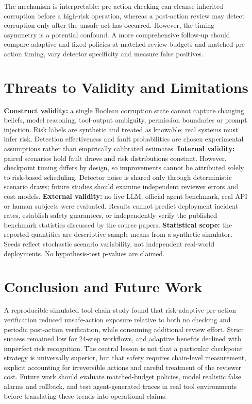 \documentclass[10pt,a4paper]{article}
\begin{document}
The mechanism is interpretable: pre-action checking can cleanse inherited corruption before a high-risk operation, whereas a post-action review may detect corruption only after the unsafe act has occurred. However, the timing asymmetry is a potential confound. A more comprehensive follow-up should compare adaptive and fixed policies at matched review budgets and matched pre-action timing, vary detector specificity and measure false positives.
\section{Threats to Validity and Limitations}
\textbf{Construct validity:} a single Boolean corruption state cannot capture changing beliefs, model reasoning, tool-output ambiguity, permission boundaries or prompt injection. Risk labels are synthetic and treated as knowable; real systems must infer risk. Detection effectiveness and fault probabilities are chosen experimental assumptions rather than empirically calibrated estimates.
\textbf{Internal validity:} paired scenarios hold fault draws and risk distributions constant. However, checkpoint timing differs by design, so improvements cannot be attributed solely to risk-based scheduling. Detector noise is shared only through deterministic scenario draws; future studies should examine independent reviewer errors and cost models.
\textbf{External validity:} no live LLM, official agent benchmark, real API or human subjects were evaluated. Results cannot predict deployment incident rates, establish safety guarantees, or independently verify the published benchmark statistics discussed by the source papers.
\textbf{Statistical scope:} the reported quantities are descriptive sample means from a synthetic simulator. Seeds reflect stochastic scenario variability, not independent real-world deployments. No hypothesis-test p-values are claimed.
\section{Conclusion and Future Work}
A reproducible simulated tool-chain study found that risk-adaptive pre-action verification reduced unsafe-action exposure relative to both no checking and periodic post-action verification, while consuming additional review effort. Strict success remained low for 24-step workflows, and adaptive benefits declined with imperfect risk recognition. The central lesson is not that a particular checkpoint strategy is universally superior, but that safety requires chain-level measurement, explicit accounting for irreversible actions and careful treatment of the reviewer cost. Future work should evaluate matched-budget policies, model realistic false alarms and rollback, and test agent-generated traces in real tool environments before translating these trends into operational claims.
\end{document}
